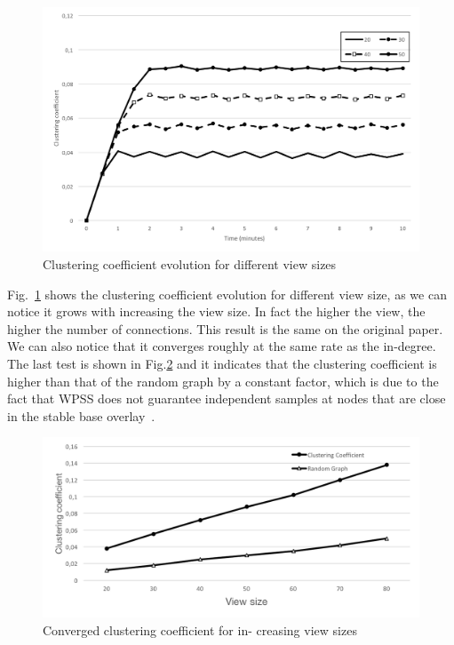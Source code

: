 \begin{figure}[ht]
  \centering
  \includegraphics[keepaspectratio=true, width=\textwidth]{images/clustering_coefficient_evolution}\caption{Clustering coefficient evolution for different view sizes}
  \label{fig:clustering_coefficient_evolution}
\end{figure}

Fig.~\ref{fig:clustering_coefficient_evolution} shows the clustering coefficient evolution for different view size, as we can notice it grows with increasing the view size. In fact the higher the view, the higher the number of connections. This result is the same on the original paper. We can also notice that it converges roughly at the same rate as the in-degree.
The last test is shown in Fig.\ref{fig:converged_clustering_coefficient} and it indicates that the clustering coefficient is higher than that of the random graph by a constant factor, which is due to the fact that WPSS does not guarantee independent samples at nodes that are close in the stable base overlay~\cite{wormhole}.

\begin{figure}[ht]
  \centering
  \includegraphics[keepaspectratio=true, width=\textwidth]{images/converged_clustering_coefficient}\caption{Converged clustering coefficient for in- creasing view sizes}
  \label{fig:converged_clustering_coefficient}
\end{figure}
